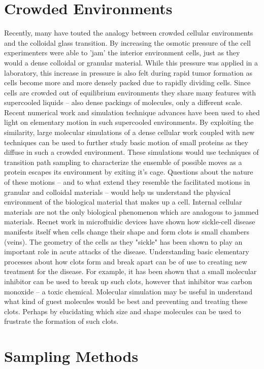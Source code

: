 \documentclass[11pt]{article}
\begin{document}
\section{Crowded Environments}
Recently, many have touted the analogy between crowded cellular environments and the colloidal glass transition.  By increasing the osmotic pressure of the cell experimenters were able to 'jam' the interior environment cells, just as they would a dense colloidal or granular material.  While this pressure was applied in a laboratory, this increase in pressure is also felt during rapid tumor formation as cells become more and more densely packed due to rapidly dividing cells.  Since cells are crowded out of equilibrium environments they share many features with supercooled liquids -- also dense packings of molecules, only a different scale.  Recent numerical work and simulation technique advances have been used to shed light on elementary motion in such supercooled environments.  By exploiting the similarity, large molecular simulations of a dense cellular work coupled with new techniques can be used to further study basic motion of small proteins as they diffuse in such a crowded environment.  These simulations would use techniques of transition path sampling to characterize the ensemble of possible moves as a protein escapes its environment by exiting it's cage.  Questions about the nature of these motions -- and to what extend they resemble the facilitated motions in granular and colloidal materials -- would help us understand the physical environment of the biological material that makes up a cell. 
Internal cellular materials are not the only biological phenomenon which are analogous to jammed materials.  Recnet work in microfluidic devices have shown how sickle-cell disease manifests itself when cells change their shape and form clots is small chambers (veins).  The geometry of the cells as they "sickle" has been shown to play an important role in acute attacks of the disease.  Understanding basic elementary processes about how clots form and break apart can be of use to creating new treatment for the disease.  For example, it has been shown that a small molecular inhibitor can be used to break up such clots, however that inhibitor was carbon monoxide -- a toxic chemical.  Molecular simulation may be useful in understand what kind of guest molecules would be best and preventing and treating these clots.  Perhaps by elucidating which size and shape molecules can be used to frustrate the formation of such clots.

\section{Sampling Methods}
\end{document}
